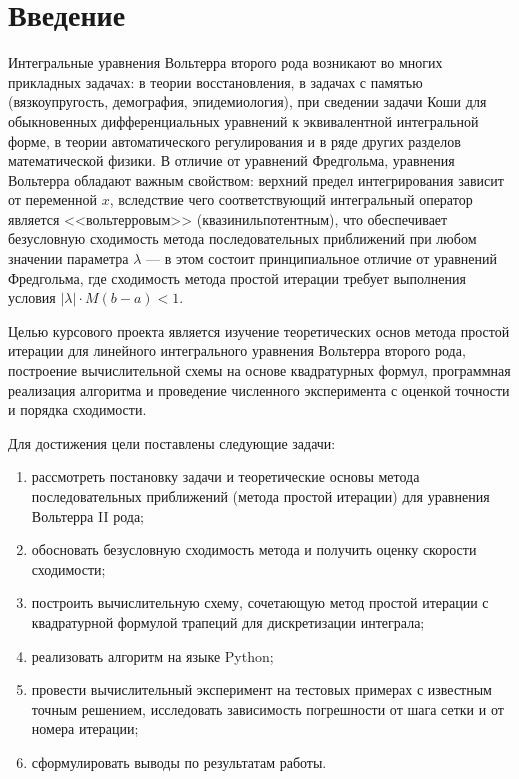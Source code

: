 \documentclass[a4paper,14pt]{extarticle}
\begin{document}
\tableofcontents
\newpage

\section*{Введение}

Интегральные уравнения Вольтерра второго рода возникают во многих прикладных задачах: в теории восстановления, в задачах с памятью (вязкоупругость, демография, эпидемиология), при сведении задачи Коши для обыкновенных дифференциальных уравнений к эквивалентной интегральной форме, в теории автоматического регулирования и в ряде других разделов математической физики. В отличие от уравнений Фредгольма, уравнения Вольтерра обладают важным свойством: верхний предел интегрирования зависит от переменной $x$, вследствие чего соответствующий интегральный оператор является <<вольтерровым>> (квазинильпотентным), что обеспечивает безусловную сходимость метода последовательных приближений при любом значении параметра $\lambda$ --- в этом состоит принципиальное отличие от уравнений Фредгольма, где сходимость метода простой итерации требует выполнения условия $|\lambda| \cdot M (b-a) < 1$.

Целью курсового проекта является изучение теоретических основ метода простой итерации для линейного интегрального уравнения Вольтерра второго рода, построение вычислительной схемы на основе квадратурных формул, программная реализация алгоритма и проведение численного эксперимента с оценкой точности и порядка сходимости.

Для достижения цели поставлены следующие задачи:
\begin{enumerate}
\item рассмотреть постановку задачи и теоретические основы метода последовательных приближений (метода простой итерации) для уравнения Вольтерра II рода;
\item обосновать безусловную сходимость метода и получить оценку скорости сходимости;
\item построить вычислительную схему, сочетающую метод простой итерации с квадратурной формулой трапеций для дискретизации интеграла;
\item реализовать алгоритм на языке Python;
\item провести вычислительный эксперимент на тестовых примерах с известным точным решением, исследовать зависимость погрешности от шага сетки и от номера итерации;
\item сформулировать выводы по результатам работы.
\end{enumerate}
\end{document}
